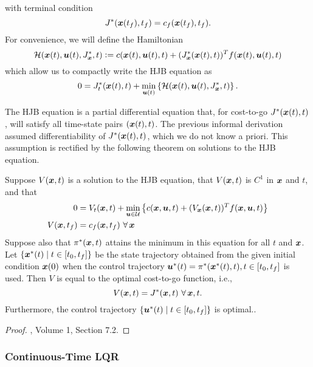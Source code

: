 with terminal condition
\begin{equation}
    J^*(\bm{x}(t_f),t_f) = c_f(\bm{x}(t_f),t_f).
\end{equation}
For convenience, we will define the Hamiltonian 
\begin{equation}
    \mathcal{H}(\bm{x}(t),\bm{u}(t),J^*_{\bm{x}},t) \vcentcolon= c(\bm{x}(t),\bm{u}(t),t) + (J_{\bm{x}}^*(\bm{x}(t),t))^T f(\bm{x}(t),\bm{u}(t),t)
\end{equation}
which allow us to compactly write the HJB equation as 
\begin{equation}
    0 = J^*_t(\bm{x}(t),t) + \min_{\bm{u}(t)} \left\{ \mathcal{H}(\bm{x}(t),\bm{u}(t),J^*_{\bm{x}},t) \right\}.
\end{equation}

The HJB equation is a partial differential equation that, for cost-to-go $J^*(\bm{x}(t),t)$, will satisfy all time-state pairs $(\bm{x}(t),t)$. The previous informal derivation assumed differentiability of $J^*(\bm{x}(t),t)$, which we do not know a priori. This assumption is rectified by the following theorem on solutions to the HJB equation. 

\begin{theorem}
Suppose $V(\bm{x},t)$ is a solution to the HJB equation, that $V(\bm{x},t)$ is $C^1$ in $\bm{x}$ and $t$, and that
\begin{align*}
    0 &= V_t(\bm{x},t) + \min_{\bm{u} \in \mathcal{U}} \left\{ c(\bm{x},\bm{u},t) + (V_{\bm{x}}(\bm{x},t))^T f(\bm{x},\bm{u},t) \right\}\\
    V(\bm{x},t_f) &= c_f(\bm{x},t_f)\,\, \forall \, \bm{x}
\end{align*}
Suppose also that $\pi^*(\bm{x},t)$ attains the minimum in this equation for all $t$ and $\bm{x}$. Let $\{\bm{x}^*(t) \mid t \in [t_0, t_f]\}$ be the state trajectory obtained from the given initial condition $\bm{x}(0)$ when the control trajectory $\bm{u}^*(t) = \pi^*(\bm{x}^*(t),t), t \in [t_0, t_f]$ is used. Then $V$ is equal to the optimal cost-to-go function, i.e.,
\begin{equation}
    V(\bm{x},t) = J^*(\bm{x},t)\,\, \forall\, \bm{x}, t.
\end{equation}
Furthermore, the control trajectory $\{\bm{u}^*(t)\mid t \in [t_0, t_f]\}$ is optimal..
\end{theorem}

\begin{proof}
\cite{bertsekas1995dynamic}, Volume 1, Section 7.2.
\end{proof}

\subsubsection{Continuous-Time LQR}

